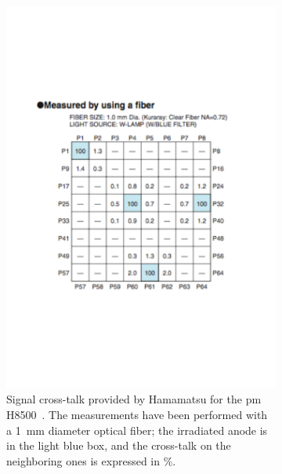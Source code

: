 \begin{figure}
\begin{subfigure}[t]{.5\textwidth}
\centering
\includegraphics[width=1\textwidth, trim={0 6cm 0 6cm}, clip=true]{03_GraphicFiles/chapter3_CLaRySproto/Hodoscope/PMchar/cross_talk_spec.pdf}
\caption{Signal cross-talk provided by Hamamatsu for the \gls{pm} H8500~\parencite{Hamamatsu2006}. The measurements have been performed with a 1~mm diameter optical fiber; the irradiated anode is in the light blue box, and the cross-talk on the neighboring ones is expressed in \%.}
\label{chap3::fig::hodoPMcharcross-talkSpec}
\end{subfigure}
\begin{subfigure}[t]{.5\textwidth}
\centering

\end{subfigure}
\end{figure}
